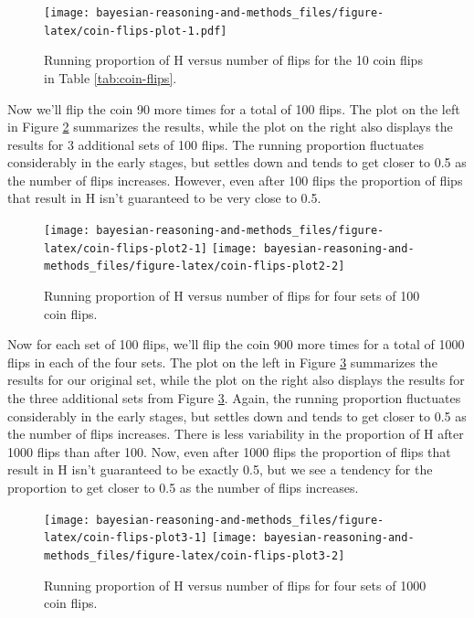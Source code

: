 \documentclass[
]{book}
\theoremstyle{definition}
\theoremstyle{definition}
\theoremstyle{definition}
\theoremstyle{remark}
\begin{document}
\begin{figure}
\centering
\texttt{[image: bayesian-reasoning-and-methods\_files/figure-latex/coin-flips-plot-1.pdf]}
\caption{\label{fig:coin-flips-plot}Running proportion of H versus number of flips for the 10 coin flips in Table \ref{tab:coin-flips}.}
\end{figure}

Now we'll flip the coin 90 more times for a total of 100 flips. The plot on the left in Figure \ref{fig:coin-flips-plot2} summarizes the results, while the plot on the right also displays the results for 3 additional sets of 100 flips. The running proportion fluctuates considerably in the early stages, but settles down and tends to get closer to 0.5 as the number of flips increases. However, even after 100 flips the proportion of flips that result in H isn't guaranteed to be very close to 0.5.



\begin{figure}
\texttt{[image: bayesian-reasoning-and-methods\_files/figure-latex/coin-flips-plot2-1]} \texttt{[image: bayesian-reasoning-and-methods\_files/figure-latex/coin-flips-plot2-2]} \caption{Running proportion of H versus number of flips for four sets of 100 coin flips.}\label{fig:coin-flips-plot2}
\end{figure}

Now for each set of 100 flips, we'll flip the coin 900 more times for a total of 1000 flips in each of the four sets. The plot on the left in Figure \ref{fig:coin-flips-plot3} summarizes the results for our original set, while the plot on the right also displays the results for the three additional sets from Figure \ref{fig:coin-flips-plot3}. Again, the running proportion fluctuates considerably in the early stages, but settles down and tends to get closer to 0.5 as the number of flips increases. There is less variability in the proportion of H after 1000 flips than after 100. Now, even after 1000 flips the proportion of flips that result in H isn't guaranteed to be exactly 0.5, but we see a tendency for the proportion to get closer to 0.5 as the number of flips increases.



\begin{figure}
\texttt{[image: bayesian-reasoning-and-methods\_files/figure-latex/coin-flips-plot3-1]} \texttt{[image: bayesian-reasoning-and-methods\_files/figure-latex/coin-flips-plot3-2]} \caption{Running proportion of H versus number of flips for four sets of 1000 coin flips.}\label{fig:coin-flips-plot3}
\end{figure}
\end{document}

